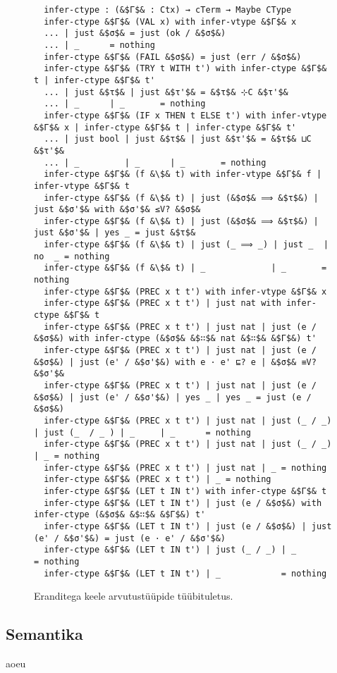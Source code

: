 \documentclass[a4paper,12pt]{article}
\begin{document}
\begin{figure}
  \begin{lstlisting}
  infer-ctype : (&$Γ$& : Ctx) → cTerm → Maybe CType
  infer-ctype &$Γ$& (VAL x) with infer-vtype &$Γ$& x
  ... | just &$σ$& = just (ok / &$σ$&)
  ... | _      = nothing
  infer-ctype &$Γ$& (FAIL &$σ$&) = just (err / &$σ$&)
  infer-ctype &$Γ$& (TRY t WITH t') with infer-ctype &$Γ$& t | infer-ctype &$Γ$& t'
  ... | just &$τ$& | just &$τ'$& = &$τ$& ⊹C &$τ'$&
  ... | _      | _       = nothing
  infer-ctype &$Γ$& (IF x THEN t ELSE t') with infer-vtype &$Γ$& x | infer-ctype &$Γ$& t | infer-ctype &$Γ$& t'
  ... | just bool | just &$τ$& | just &$τ'$& = &$τ$& ⊔C &$τ'$&
  ... | _         | _      | _       = nothing
  infer-ctype &$Γ$& (f &\$& t) with infer-vtype &$Γ$& f | infer-vtype &$Γ$& t
  infer-ctype &$Γ$& (f &\$& t) | just (&$σ$& ⟹ &$τ$&) | just &$σ'$& with &$σ'$& ≤V? &$σ$&
  infer-ctype &$Γ$& (f &\$& t) | just (&$σ$& ⟹ &$τ$&) | just &$σ'$& | yes _ = just &$τ$&
  infer-ctype &$Γ$& (f &\$& t) | just (_ ⟹ _) | just _  | no  _ = nothing
  infer-ctype &$Γ$& (f &\$& t) | _             | _       = nothing
  infer-ctype &$Γ$& (PREC x t t') with infer-vtype &$Γ$& x
  infer-ctype &$Γ$& (PREC x t t') | just nat with infer-ctype &$Γ$& t
  infer-ctype &$Γ$& (PREC x t t') | just nat | just (e / &$σ$&) with infer-ctype (&$σ$& &$∷$& nat &$∷$& &$Γ$&) t'
  infer-ctype &$Γ$& (PREC x t t') | just nat | just (e / &$σ$&) | just (e' / &$σ'$&) with e · e' ⊑? e | &$σ$& ≡V? &$σ'$&
  infer-ctype &$Γ$& (PREC x t t') | just nat | just (e / &$σ$&) | just (e' / &$σ'$&) | yes _ | yes _ = just (e / &$σ$&)
  infer-ctype &$Γ$& (PREC x t t') | just nat | just (_ / _) | just (_  / _ ) | _     | _      = nothing
  infer-ctype &$Γ$& (PREC x t t') | just nat | just (_ / _) | _ = nothing
  infer-ctype &$Γ$& (PREC x t t') | just nat | _ = nothing
  infer-ctype &$Γ$& (PREC x t t') | _ = nothing
  infer-ctype &$Γ$& (LET t IN t') with infer-ctype &$Γ$& t 
  infer-ctype &$Γ$& (LET t IN t') | just (e / &$σ$&) with infer-ctype (&$σ$& &$∷$& &$Γ$&) t'
  infer-ctype &$Γ$& (LET t IN t') | just (e / &$σ$&) | just (e' / &$σ'$&) = just (e · e' / &$σ'$&)
  infer-ctype &$Γ$& (LET t IN t') | just (_ / _) | _              = nothing
  infer-ctype &$Γ$& (LET t IN t') | _            = nothing
  \end{lstlisting}
  \caption{Eranditega keele arvutustüüpide tüübituletus.}
  \label{fig:exc.infer-ctype}
\end{figure}


\subsection{Semantika}
aoeu
\end{document}
